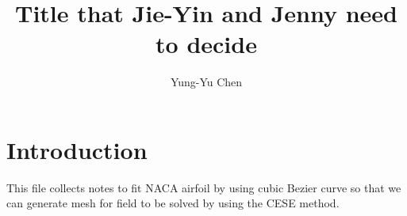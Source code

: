 \documentclass{turgon}
\title{
%
Title that Jie-Yin and Jenny need to decide
%
}
\author{
%
Yung-Yu Chen
%
}
\begin{document}
\maketitle

\tableofcontents

\chapter*{Introduction}

This file collects notes to fit NACA airfoil by using cubic Bezier curve so
that we can generate mesh for field to be solved by using the CESE
method\cite{chang_method_1995}.

\clearpage
{}


\end{document}
